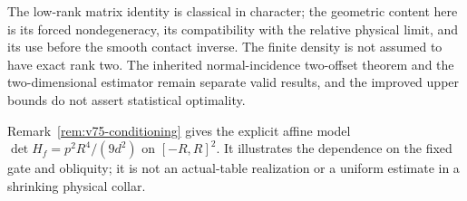 The low-rank matrix identity is classical in character; the geometric
content here is its forced nondegeneracy, its compatibility with the
relative physical limit, and its use before the smooth contact inverse.
The finite density is not assumed to have exact rank two.  The inherited
normal-incidence two-offset theorem and the two-dimensional estimator
remain separate valid results, and the improved upper bounds do not
assert statistical optimality.

Remark~\ref{rem:v75-conditioning} gives the explicit affine model
$\det H_f=p^2R^4/(9d^2)$ on $[-R,R]^2$.  It illustrates the dependence
on the fixed gate and obliquity; it is not an actual-table realization
or a uniform estimate in a shrinking physical collar.
